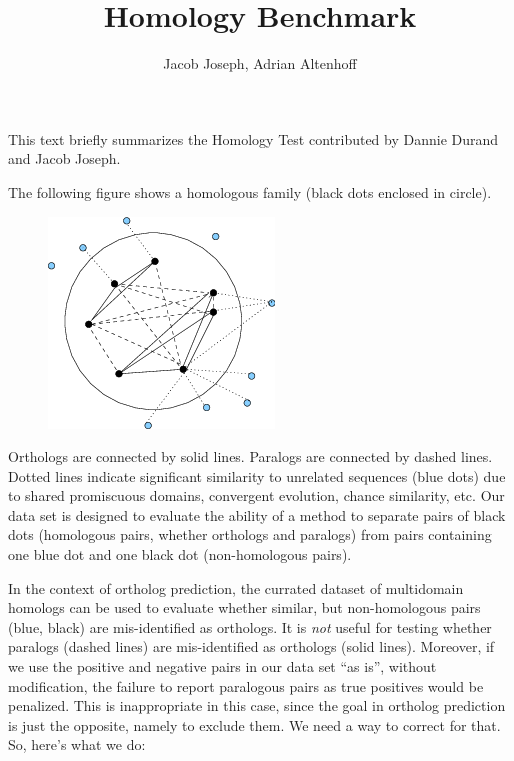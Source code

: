 \documentclass[a4paper,11pt]{article}
\title{Homology Benchmark}
\author{Jacob Joseph, Adrian Altenhoff}
\begin{document}
\maketitle

This text briefly summarizes the Homology Test contributed by Dannie Durand and Jacob Joseph.

The following figure shows a homologous family (black dots enclosed in circle). 
\begin{figure}[hbt]
  \begin{center}
    \includegraphics[width=.5\textwidth]{figures/homologyBenchmark}
    \label{fig}
  \end{center}
\end{figure}

Orthologs are connected by solid lines. Paralogs are connected by dashed lines. Dotted lines indicate significant similarity to unrelated
sequences (blue dots) due to shared promiscuous domains, convergent evolution, chance similarity, etc. Our
data set is designed to evaluate the ability of a method to separate pairs of black dots (homologous pairs, whether orthologs and paralogs) from pairs containing one blue dot and one black dot (non-homologous pairs).

In the context of ortholog prediction, the currated dataset of multidomain homologs can be used to evaluate whether similar, but non-homologous pairs (blue, black) are mis-identified as orthologs. It is \emph{not} useful for testing whether paralogs (dashed lines) are mis-identified as orthologs (solid lines). Moreover, if we use the positive and negative pairs in our data set ``as is'', without modification, the failure to report paralogous pairs as true positives would be penalized. This is inappropriate in this case, since the goal in ortholog prediction is just the opposite, namely to exclude them. We need a way to correct for that. So, here’s what we do:
\end{document}
